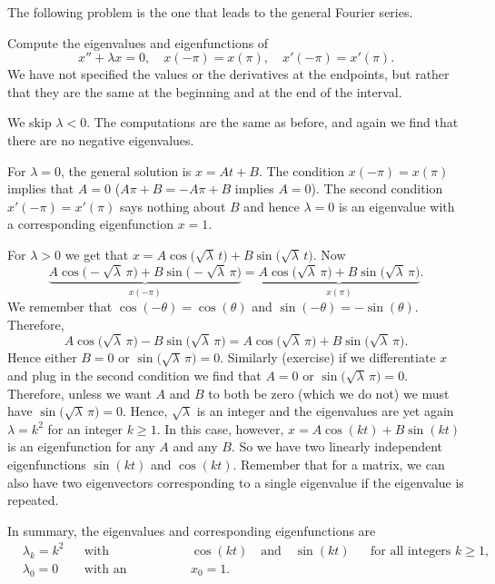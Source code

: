 The following problem is the one that leads to the general Fourier
series.

\begin{example} \label{bvp-periodic:example}
Compute the 
eigenvalues and eigenfunctions of
\begin{equation*}
x'' + \lambda x = 0, \quad x(-\pi) = x(\pi), \quad x'(-\pi) = x'(\pi) .
\end{equation*}
We have not specified the values or the derivatives
at the endpoints, but rather that they are the same at the beginning and
at the end of the interval.

We skip $\lambda < 0$.  The computations are the same as before,
and again we find
that there are no negative eigenvalues.

For $\lambda = 0$, the general solution is $x = At + B$.  The condition
$x(-\pi) = x(\pi)$ implies that $A=0$ ($A\pi + B = -A\pi +B$ implies $A=0$).
The second condition $x'(-\pi) = x'(\pi)$ says nothing about $B$ and hence
$\lambda=0$ is an eigenvalue with a corresponding eigenfunction $x=1$.

For $\lambda > 0$ we get that
$x = A \cos \bigl( \sqrt{\lambda}\, t \bigr)
+ B \sin \bigl( \sqrt{\lambda}\, t\bigr)$.
Now
\begin{equation*}
\underbrace{A \cos \bigl(-\sqrt{\lambda}\, \pi\bigr)
+ B \sin \bigl(-\sqrt{\lambda}\,
\pi\bigr)}_{x(-\pi)}
=
\underbrace{A \cos \bigl(  \sqrt{\lambda}\, \pi \bigr)
+ B \sin \bigl( \sqrt{\lambda}\,
\pi\bigr)}_{x(\pi)} .
\end{equation*}
We remember that $\cos (- \theta) = \cos (\theta)$ and
$\sin (-\theta) = - \sin (\theta)$.  Therefore,
\begin{equation*}
A \cos \bigl(\sqrt{\lambda}\, \pi\bigr)
- B \sin \bigl( \sqrt{\lambda}\, \pi\bigr)
=
A \cos \bigl(\sqrt{\lambda}\, \pi\bigr)
+ B \sin \bigl( \sqrt{\lambda}\, \pi\bigr).
\end{equation*}
Hence either $B=0$ or $\sin \bigl( \sqrt{\lambda}\, \pi\bigr) = 0$.
Similarly (exercise) if we differentiate $x$ and plug in the second
condition we find that $A=0$ or $\sin \bigl( \sqrt{\lambda}\, \pi\bigr) = 0$.
Therefore, unless we want $A$ and $B$ to both be zero (which we do not)
we must have $\sin \bigl( \sqrt{\lambda}\, \pi \bigr) = 0$.  Hence, $\sqrt{\lambda}$
is an integer and the eigenvalues are yet again $\lambda = k^2$ for
an integer $k \geq 1$.  In this case, however, 
$x = A \cos (k t) + B \sin (k t)$ is an eigenfunction for any $A$ and any $B$.
So we have two linearly independent eigenfunctions $\sin (kt)$ and $\cos (kt)$.
Remember that for a matrix, we can also have two eigenvectors
corresponding to a single eigenvalue if the eigenvalue is repeated.

In summary, the eigenvalues and corresponding eigenfunctions are
\begin{align*}
& \lambda_k = k^2 & & \text{with eigenfunctions} & &
\cos (k t) \quad \text{and}\quad  \sin (k t)
 & & \text{for all integers } k \geq 1 , \\
& \lambda_0 = 0 & & \text{with an eigenfunction} & & x_0 = 1.
\end{align*}
\end{example}

